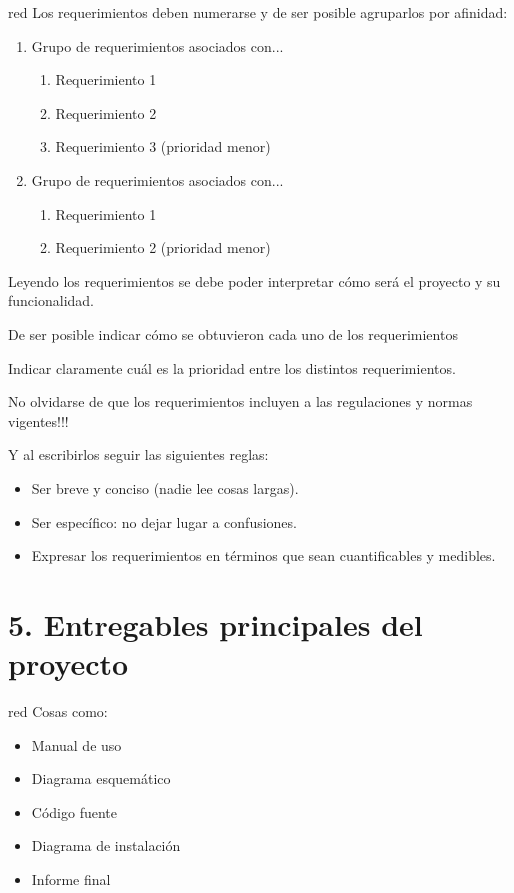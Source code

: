 \documentclass[11pt]{charter}
\begin{document}
\begin{consigna}{red}
Los requerimientos deben numerarse y de ser posible agruparlos por afinidad:

\begin{enumerate}
\item Grupo de requerimientos asociados con...
	\begin{enumerate}
	\item Requerimiento 1
	\item Requerimiento 2
	\item Requerimiento 3 (prioridad menor)
	\end{enumerate}
\item Grupo de requerimientos asociados con...
	\begin{enumerate}
	\item Requerimiento 1
	\item Requerimiento 2 (prioridad menor)
	\end{enumerate}
\end{enumerate}

Leyendo los requerimientos se debe poder interpretar cómo será el proyecto y su funcionalidad.

De ser posible indicar cómo se obtuvieron cada uno de los requerimientos 

Indicar claramente cuál es la prioridad entre los distintos requerimientos. 

No olvidarse de que los requerimientos incluyen a las regulaciones y normas vigentes!!!

Y al escribirlos seguir las siguientes reglas:
\begin{itemize}
\item Ser breve y conciso (nadie lee cosas largas). 
\item Ser específico: no dejar lugar a confusiones.
\item Expresar los requerimientos en términos que sean cuantificables y medibles.
\end{itemize}

\end{consigna}

\section{5. Entregables principales del proyecto}
\label{sec:entregables}

\begin{consigna}{red}
Cosas como: 
\begin{itemize}
\item Manual de uso
\item Diagrama esquemático
\item Código fuente
\item Diagrama de instalación
\item Informe final

\end{itemize}

\end{consigna}
\end{document}
